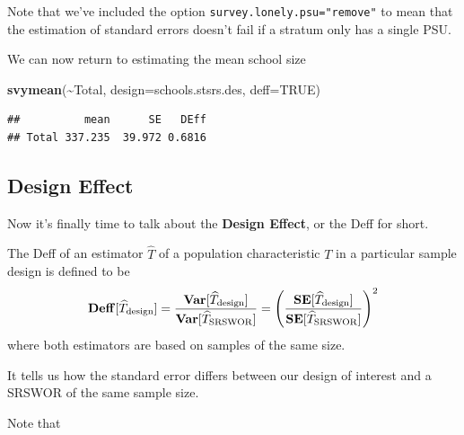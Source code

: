 \documentclass[
]{book}
\newenvironment{Shaded}{\begin{snugshade}}{\end{snugshade}}
\newcommand{\AttributeTok}[1]{\textcolor[rgb]{0.13,0.29,0.53}{#1}}
\newcommand{\ConstantTok}[1]{\textcolor[rgb]{0.56,0.35,0.01}{#1}}
\newcommand{\FunctionTok}[1]{\textcolor[rgb]{0.13,0.29,0.53}{\textbf{#1}}}
\newcommand{\NormalTok}[1]{#1}
\newcommand{\SpecialCharTok}[1]{\textcolor[rgb]{0.81,0.36,0.00}{\textbf{#1}}}
\newcommand{\bfa}[2]{{\rm\bf #1}[#2]}
\begin{document}
Note that we've included the option \texttt{survey.lonely.psu="remove"} to mean
that the estimation of standard errors doesn't fail if a stratum only has a single
PSU.

We can now return to estimating the mean school size

\begin{Shaded}
\begin{Highlighting}[]
\FunctionTok{svymean}\NormalTok{(}\SpecialCharTok{\textasciitilde{}}\NormalTok{Total, }\AttributeTok{design=}\NormalTok{schools.stsrs.des, }\AttributeTok{deff=}\ConstantTok{TRUE}\NormalTok{)}
\end{Highlighting}
\end{Shaded}

\begin{verbatim}
##          mean      SE   DEff
## Total 337.235  39.972 0.6816
\end{verbatim}

\subsection{Design Effect}\label{design-effect}

Now it's finally time to talk about the \textbf{Design Effect}, or the Deff for short.

The Deff of an estimator \(\widehat{T}\) of a population characteristic \(T\) in
a particular sample design is defined to be
\[
   \bfa{Deff}{\widehat{T}_{\text{design}}}
   = 
   \frac{\bfa{Var}{\widehat{T}_{\text{design}}}}{
         \bfa{Var}{\widehat{T}_{\text{SRSWOR}}}}
   = 
   \left(\frac{\bfa{SE}{\widehat{T}_{\text{design}}}}{
               \bfa{SE}{\widehat{T}_{\text{SRSWOR}}}}\right)^2
\]
where both estimators are based on samples of the same size.

It tells us how the standard error differs between our design of
interest and a SRSWOR of the same sample size.

Note that
\end{document}
